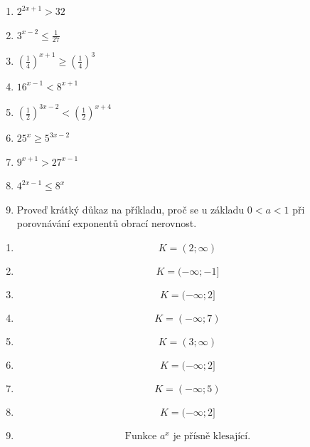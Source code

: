 \documentclass[11pt,a4paper]{article}
\begin{document}
\begin{zadaniReseniBox}[title={Domácí úkol}]
\begin{enumerate}[label=\alph*)]
\item $2^{2x+1}>32$
\item $3^{x-2}\le\frac1{27}$
\item $\left(\frac14\right)^{x+1}\ge\left(\frac14\right)^3$
\item $16^{x-1}<8^{x+1}$
\item $\left(\frac12\right)^{3x-2}<\left(\frac12\right)^{x+4}$
\item $25^x\ge5^{3x-2}$
\item $9^{x+1}>27^{x-1}$
\item $4^{2x-1}\le8^x$
\item Proveď krátký důkaz na příkladu, proč se u základu $0<a<1$ při porovnávání exponentů obrací nerovnost.
\end{enumerate}
\tcblower
\begin{enumerate}[label=\alph*)]
\item \[K=(2;\infty)\]
\item \[K=(-\infty;-1]\]
\item \[K=(-\infty;2]\]
\item \[K=(-\infty;7)\]
\item \[K=(3;\infty)\]
\item \[K=(-\infty;2]\]
\item \[K=(-\infty;5)\]
\item \[K=(-\infty;2]\]
\item \[\text{Funkce }a^x\text{ je přísně klesající.}\]
\end{enumerate}
\end{zadaniReseniBox}
\end{document}
